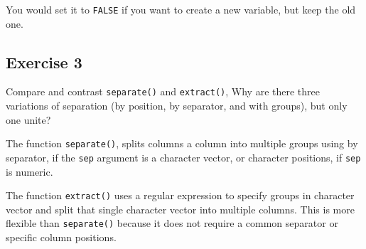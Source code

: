 \documentclass[]{book}
\newenvironment{Shaded}{\begin{snugshade}}{\end{snugshade}}
\newcommand{\CommentTok}[1]{\textcolor[rgb]{0.56,0.35,0.01}{\textit{#1}}}
\newcommand{\DataTypeTok}[1]{\textcolor[rgb]{0.13,0.29,0.53}{#1}}
\newcommand{\DecValTok}[1]{\textcolor[rgb]{0.00,0.00,0.81}{#1}}
\newcommand{\KeywordTok}[1]{\textcolor[rgb]{0.13,0.29,0.53}{\textbf{#1}}}
\newcommand{\NormalTok}[1]{#1}
\newcommand{\OperatorTok}[1]{\textcolor[rgb]{0.81,0.36,0.00}{\textbf{#1}}}
\newcommand{\StringTok}[1]{\textcolor[rgb]{0.31,0.60,0.02}{#1}}
\theoremstyle{plain}
\theoremstyle{remark}
\theoremstyle{definition}
\theoremstyle{definition}
\theoremstyle{definition}
\theoremstyle{remark}
\begin{document}
You would set it to \texttt{FALSE} if you want to create a new variable,
but keep the old one.

\hypertarget{exercise-3-20}{%
\subsection{Exercise 3}\label{exercise-3-20}}

Compare and contrast \texttt{separate()} and \texttt{extract()}, Why are
there three variations of separation (by position, by separator, and
with groups), but only one unite?

The function \texttt{separate()}, splits columns a column into multiple
groups using by separator, if the \texttt{sep} argument is a character
vector, or character positions, if \texttt{sep} is numeric.

\begin{Shaded}
\end{Shaded}

The function \texttt{extract()} uses a regular expression to specify
groups in character vector and split that single character vector into
multiple columns. This is more flexible than \texttt{separate()} because
it does not require a common separator or specific column positions.
\end{document}
